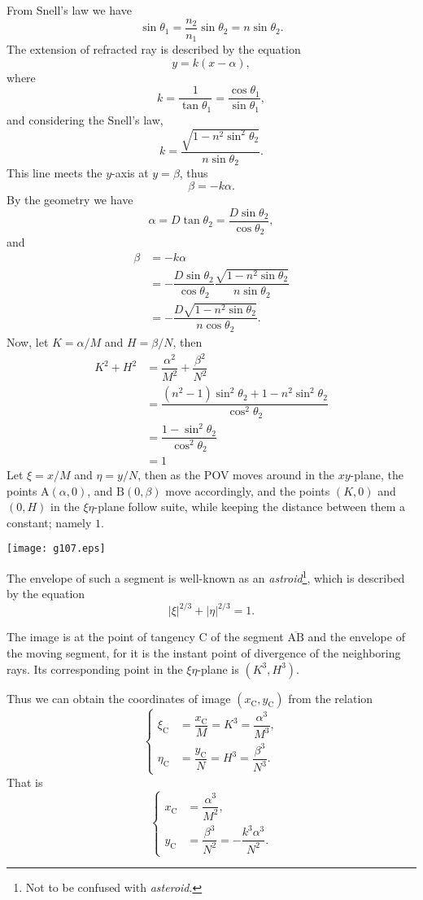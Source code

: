 \documentclass[twocolumn]{article}
\begin{document}
From Snell's law we have
$$ \sin\theta_1 = \frac{n_2}{n_1} \sin\theta_2 = n\sin\theta_2.$$
The extension of refracted ray is described by the equation 
$$y=k(x-\alpha),$$
where 
$$k=\dfrac{1}{\tan\theta_1}=\dfrac{\cos\theta_1}{\sin\theta_1},$$
and considering the Snell's law,
$$k=\dfrac{\sqrt{1-n^2\sin^2\theta_2}}{n\sin\theta_2}.$$
This line meets the $y$-axis at $y=\beta$, thus
$$\beta = -k\alpha.$$
By the geometry we have
$$\alpha = D\tan\theta_2 = \dfrac{D\sin\theta_2}{\cos\theta_2},$$
and
$$\begin{aligned}
	\beta &= -k\alpha \\
	&= -\dfrac{D\sin\theta_2}{\cos\theta_2}
	\dfrac{\sqrt{1-n^2\sin\theta_2}}{n\sin\theta_2}\\
	&=-\dfrac{D\sqrt{1-n^2\sin\theta_2}}{n\cos\theta_2}.
\end{aligned}$$
Now, let $K=\alpha/M$ and $H=\beta/N$, then
$$ \begin{aligned}
	K^2 + H^2 &= \dfrac{\alpha^2}{M^2}+\dfrac{\beta^2}{N^2}\\
	&=\dfrac{\left(n^2-1\right)\sin^2\theta_2 + 1-n^2\sin^2\theta_2}
	{\cos^2\theta_2}\\
	&=\dfrac{1-\sin^2\theta_2}{\cos^2\theta_2}\\
	&=1
\end{aligned}$$
Let $\xi=x/M$ and $\eta=y/N$, then as the POV moves around in the $xy$-plane,
the points $\mathrm{A}(\alpha, 0)$, and $\mathrm{B}(0, \beta)$ move accordingly,  
and the points $(K, 0)$ and $(0, H)$ in the $\xi\eta$-plane follow suite, 
while keeping the distance between them a constant; namely $1$.

\texttt{[image: g107.eps]}

The envelope of such a segment is well-known as an \emph{astroid}\footnote{Not 
to be confused with {\emph{asteroid}}.}, which is described by the 
equation
$$ \left| \xi \right|^{2/3} + \left| \eta \right|^{2/3} = 1. $$

The image is at the point of tangency $\mathrm{C}$ of the segment 
$\overline{\mathrm{AB}}$ and the envelope of the moving segment, for 
it is the instant point of divergence of the neighboring rays.
Its corresponding point in the $\xi\eta$-plane is $(K^3, H^3)$.

Thus we can obtain the coordinates of image $(x_{\mathrm{C}}^{}, y_{\mathrm{C}}^{})$ 
from the relation
$$ \left\{ 
\begin{aligned}
	\xi_{\mathrm{C}}^{} &= \dfrac{x_{\mathrm{C}}^{}}{M} = K^3 = \dfrac{\alpha^3}{M^3},\\
	\eta_{\mathrm{C}}^{} &= \dfrac{y_{\mathrm{C}}^{}}{N} = H^3 = \dfrac{\beta^3}{N^3}.
\end{aligned}
\right.$$
That is
$$ \left\{ 
\begin{aligned}
	x_{\mathrm{C}}^{} &= \dfrac{\alpha^3}{M^2},\\
	y_{\mathrm{C}}^{} &= \dfrac{\beta^3}{N^2}=-\dfrac{k^3\alpha^3}{N^2}.
\end{aligned}
\right.$$
\end{document}
